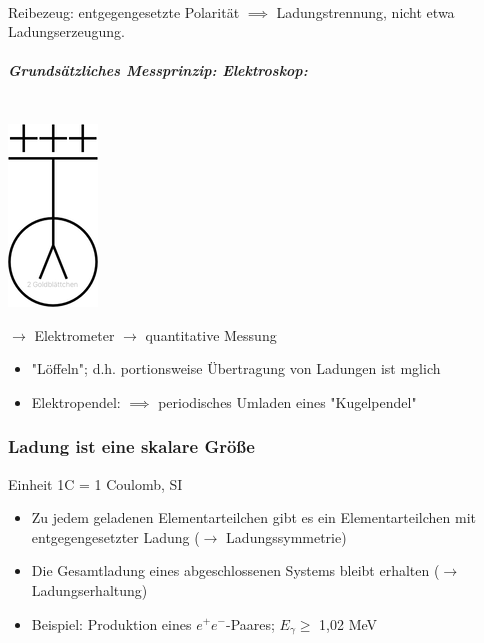 \documentclass[11pt]{article}
\begin{document}
			\linebreak\\
			Reibezeug: entgegengesetzte Polarit\"{a}t
			$\implies$ Ladungstrennung, nicht etwa Ladungserzeugung.
			\linebreak\\
			\subparagraph {Grunds\"{a}tzliches Messprinzip: Elektroskop:} \hfill \\
			
			\includegraphics{skizzen/14/14_1B1}
			
			$\rightarrow$ Elektrometer $\rightarrow$ quantitative Messung
			\begin{itemize}
				\item "L\"{o}ffeln"; d.h. portionsweise Übertragung von Ladungen ist mglich
				\item Elektropendel: $\implies$ periodisches Umladen eines "Kugelpendel"
			\end{itemize}
			
			\subsubsection{Ladung ist eine skalare Gr\"{o}\ss{}e } Einheit 1C = 1 Coulomb, SI
				\begin{itemize}
					\item Zu jedem geladenen Elementarteilchen gibt es ein Elementarteilchen mit entgegengesetzter Ladung ($\rightarrow$ Ladungssymmetrie)
					\item Die Gesamtladung eines abgeschlossenen Systems bleibt erhalten ($\rightarrow$ Ladungserhaltung)
					\item Beispiel: Produktion eines $ e^+e^- $-Paares; $ E_\gamma \geq $ 1,02 MeV
				\end{itemize}
				
\end{document}
